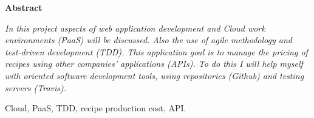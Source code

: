 \documentclass[spanish,a4paper,twoside]{report}
\newenvironment{summary}
{\par\noindent\begin{center}\textbf{Abstract}\end{center}\begin{itshape}\par\noindent}
{\end{itshape}}
\newenvironment{keywords}
{\begin{list}{}{\setlength{\leftmargin}{1em}}\item[\hskip\labelsep \bfseries Keywords:]}
{\end{list}}
\begin{document}
\cleardoublepage
\begin{summary}
{\em 
In this project aspects of web application development and Cloud work environments (PaaS) will be discussed. Also the use of agile methodology and test-driven development (TDD). This application goal is to manage the pricing of recipes using other companies' applications (APIs). To do this I will help myself with oriented software development tools, using repositories (Github) and testing servers (Travis).
}

\vspace*{0.2in}
\begin{keywords}
  Cloud, PaaS, TDD, recipe production cost, API.
\end{keywords}

\end{summary}

\newpage{\pagestyle{empty}\cleardoublepage}
\thispagestyle{empty}



\pagestyle{myheadings} %

\renewcommand{\thepage}{\arabic{page}}
\setcounter{page}{1}


\tableofcontents

\newpage{\pagestyle{empty}\cleardoublepage}

\listoffigures

\newpage{\pagestyle{empty}\cleardoublepage}


\newpage{\pagestyle{empty}\cleardoublepage}
\end{document}
